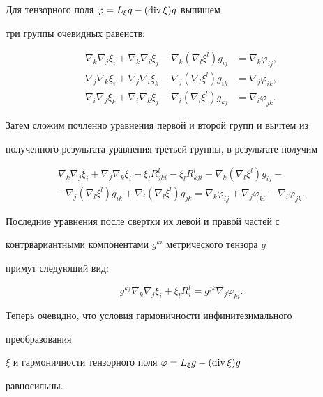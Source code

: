 \begin{pf} 


Для тензорного поля $\varphi=L_\xi g-(\operatorname{div}\xi)g$ выпишем 


три группы очевидных равенств: 


\begin{align*} 


\nabla_k\nabla_j\xi_i+\nabla_k\nabla_i\xi_j- 


\nabla_k(\nabla_l\xi^l)g_{ij}&=\nabla_k\varphi_{ij},\\ 


% 


\nabla_j\nabla_k\xi_i+\nabla_j\nabla_i\xi_k- 


\nabla_j(\nabla_l\xi^l)g_{ik}&=\nabla_j\varphi_{ik},\\ 


%


\nabla_i\nabla_j\xi_k+\nabla_i\nabla_k\xi_j- 


\nabla_i(\nabla_l\xi^l)g_{kj}&=\nabla_i\varphi_{jk}.


\end{align*} 


Затем сложим почленно уравнения первой и второй групп и вычтем из 


полученного результата уравнения третьей группы, в результате получим 


\begin{multline*} 


\nabla_k\nabla_j\xi_i+\nabla_j\nabla_k\xi_i-\xi_l R^l_{jki} 


-\xi_lR^l_{kji}-\nabla_k(\nabla_l\xi^l)g_{ij}- \\ 


% 


-\nabla_j(\nabla_l\xi^l)g_{ik}+\nabla_i(\nabla_l\xi^l)g_{jk}= 


\nabla_k\varphi_{ij}+\nabla_j\varphi_{ki}-\nabla_i\varphi_{jk}. 


\end{multline*} 


Последние уравнения после свертки их левой и правой частей с 


контрвариантными компонентами $g^{ki}$ метрического тензора $g$ 


примут следующий вид: 


$$ 


g^{kj}\nabla_k\nabla_j\xi_i+\xi_lR^l_i= 


g^{jk}\nabla_j\varphi_{ki}. 


$$ 


Теперь очевидно, что условия гармоничности инфинитезимального 


преобразования 


$\xi$ и гармоничности тензорного поля $\varphi=L_\xi g-(\operatorname{div}\xi)g$ 


равносильны. 


\end{pf} 


